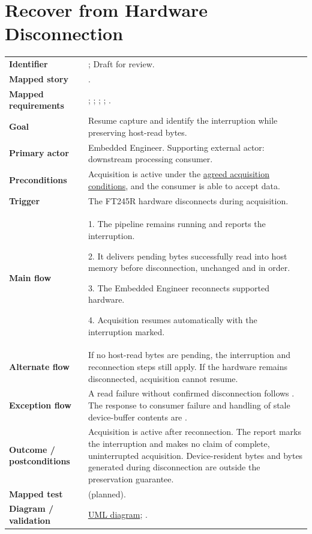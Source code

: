 \section{Recover from Hardware Disconnection}
\begin{tabularx}{\linewidth}{L{3.5cm}Y}
\toprule
\textbf{Identifier} & ; Draft for review.\\
\textbf{Mapped story} & .\\
\textbf{Mapped requirements} & ; ; ; ; .\\
\textbf{Goal} & Resume capture and identify the interruption while preserving host-read bytes.\\
\textbf{Primary actor} & Embedded Engineer. Supporting external actor: downstream processing consumer.\\
\textbf{Preconditions} & Acquisition is active under the \hyperref[Section:ProjectAcquisitionConditions]{agreed acquisition conditions}, and the consumer is able to accept data.\\
\textbf{Trigger} & The FT245R hardware disconnects during acquisition.\\
\textbf{Main flow} & 1. The pipeline remains running and reports the interruption.\par 2. It delivers pending bytes successfully read into host memory before disconnection, unchanged and in order.\par 3. The Embedded Engineer reconnects supported hardware.\par 4. Acquisition resumes automatically with the interruption marked.\\
\textbf{Alternate flow} & If no host-read bytes are pending, the interruption and reconnection steps still apply. If the hardware remains disconnected, acquisition cannot resume.\\
\textbf{Exception flow} & A read failure without confirmed disconnection follows . The response to consumer failure and handling of stale device-buffer contents are \OwnedTBD{}.\\
\textbf{Outcome / postconditions} & Acquisition is active after reconnection. The report marks the interruption and makes no claim of complete, uninterrupted acquisition. Device-resident bytes and bytes generated during disconnection are outside the preservation guarantee.\\
\textbf{Mapped test} &  (planned).\\
\textbf{Diagram / validation} & \hyperref[Figure:UseCaseDiagram]{UML diagram}; .\\
\bottomrule
\end{tabularx}

